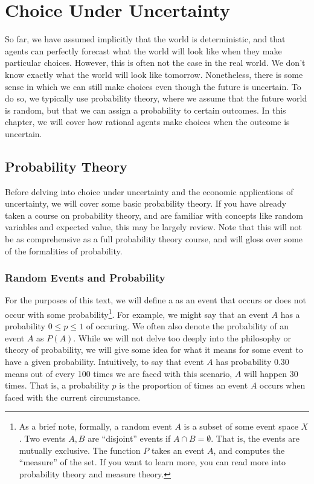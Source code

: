 \chapter{Choice Under Uncertainty}
So far, we have assumed implicitly that the world is deterministic, and that agents can perfectly forecast what the world will look like when they make particular choices. However, this is often not the case in the real world. We don't know exactly what the world will look like tomorrow. Nonetheless, there is some sense in which we can still make choices even though the future is uncertain. To do so, we typically use probability theory, where we assume that the future world is random, but that we can assign a probability to certain outcomes. In this chapter, we will cover how rational agents make choices when the outcome is uncertain. 

\section{Probability Theory}
Before delving into choice under uncertainty and the economic applications of uncertainty, we will cover some basic probability theory. If you have already taken a course on probability theory, and are familiar with concepts like random variables and expected value, this may be largely review. Note that this will not be as comprehensive as a full probability theory course, and will gloss over some of the formalities of probability.

\subsection*{Random Events and Probability}
For the purposes of this text, we will define a  as an event that occurs or does not occur with some probability\footnote{
    As a brief note, formally, a random event $A$ is a subset of some event space $X$. Two events $A, B$ are ``disjoint'' events if $A \cap B = \emptyset$. That is, the events are mutually exclusive. The function $P$ takes an event $A$, and computes the ``measure'' of the set. If you want to learn more, you can read more into probability theory and measure theory. 
}. For example, we might say that an event $A$ has a probability $0 \leq p \leq 1$ of occuring. We often also denote the probability of an event $A$ as $P(A)$. While we will not delve too deeply into the philosophy or theory of probability, we will give some idea for what it means for some event to have a given probability. Intuitively, to say that event $A$ has probability $0.30$ means out of every 100 times we are faced with this scenario, $A$ will happen 30 times. That is, a probability $p$ is the proportion of times an event $A$ occurs when faced with the current circumstance. 

